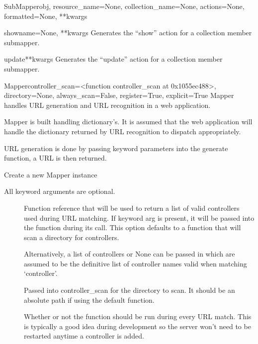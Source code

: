 \documentclass[letterpaper,10pt,english]{manual}
\begin{document}
\begin{classdesc}{SubMapper}{obj, resource\_name=None, collection\_name=None, actions=None, formatted=None, **kwargs}
\hypertarget{routes.mapper.SubMapper.show}{}\begin{methoddesc}{show}{name=None, **kwargs}
Generates the ``show'' action for a collection member submapper.
\end{methoddesc}

\hypertarget{routes.mapper.SubMapper.update}{}\begin{methoddesc}{update}{**kwargs}
Generates the ``update'' action for a collection member submapper.
\end{methoddesc}
\end{classdesc}

\hypertarget{routes.mapper.Mapper}{}\begin{classdesc}{Mapper}{controller\_scan=\textless{}function controller\_scan at 0x1055ec488\textgreater{}, directory=None, always\_scan=False, register=True, explicit=True}
Mapper handles URL generation and URL recognition in a web
application.

Mapper is built handling dictionary's. It is assumed that the web
application will handle the dictionary returned by URL recognition
to dispatch appropriately.

URL generation is done by passing keyword parameters into the
generate function, a URL is then returned.

Create a new Mapper instance

All keyword arguments are optional.
\begin{description}
\item[] \leavevmode
Function reference that will be used to return a list of
valid controllers used during URL matching. If
 keyword arg is present, it will be passed
into the function during its call. This option defaults to
a function that will scan a directory for controllers.

Alternatively, a list of controllers or None can be passed
in which are assumed to be the definitive list of
controller names valid when matching `controller'.

\item[] \leavevmode
Passed into controller\_scan for the directory to scan. It
should be an absolute path if using the default 
 function.

\item[] \leavevmode
Whether or not the  function should be
run during every URL match. This is typically a good idea
during development so the server won't need to be restarted
anytime a controller is added.


\end{description}
\end{classdesc}
\end{document}

